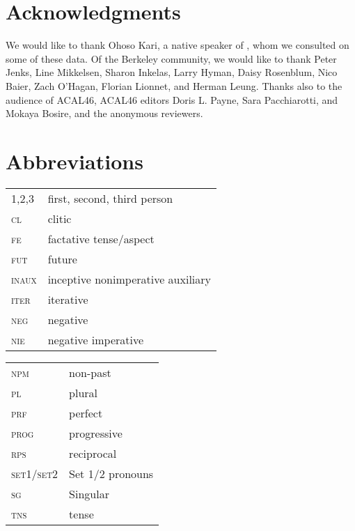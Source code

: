 \documentclass[output=paper]{langsci/langscibook}
\begin{document}
\section*{Acknowledgments}


We would like to thank Ohoso Kari, a native speaker of , whom we consulted on some of these data. Of the Berkeley community, we would like to thank Peter Jenks, Line Mikkelsen, Sharon Inkelas, Larry Hyman, Daisy Rosenblum, Nico Baier, Zach O’Hagan, Florian Lionnet, and Herman Leung. Thanks also to the audience of ACAL46, ACAL46 editors Doris L. Payne, Sara Pacchiarotti, and Mokaya Bosire, and the anonymous reviewers.


\section*{Abbreviations}

\begin{tabularx}{.58\textwidth}{>{\scshape}lQ}
1,2,3 & first, second, third   person \\
cl & clitic \\
fe & factative tense/aspect \\
fut & future \\
inaux & inceptive nonimperative auxiliary \\
iter & iterative \\
neg & negative \\
nie  & negative imperative \\
\end{tabularx}
\begin{tabularx}{.42\textwidth}{>{\scshape}lQ}
npm & non-past \\
pl & plural \\
prf & perfect \\
prog & progressive\\
rps & reciprocal \\
set1/set2 & Set 1/2 pronouns \\
sg & Singular \\
tns & tense \\
\end{tabularx}
 
\printbibliography[heading=subbibliography,notkeyword=this]
\end{document}
